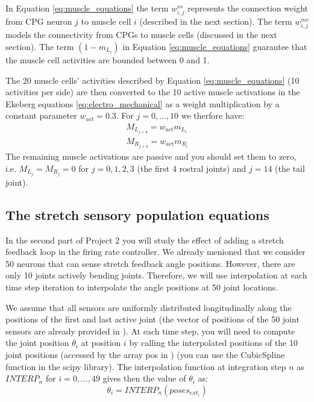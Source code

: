 \documentclass{cmc}
\begin{document}
In Equation \ref{eq:muscle_equations} the term $w^{ss}_{i,j}$ represents the connection weight from CPG neuron $j$ to muscle cell $i$ (described in the next section). The term $w^{mc}_{i,j}$  models the connectivity from CPGs to muscle cells (discussed in the next section). The term $(1-m_{L_i})$ in Equation \ref{eq:muscle_equations} guarantee that the muscle cell activities are bounded between 0 and 1.

The 20 muscle cells' activities described by Equation \ref{eq:muscle_equations} (10 activities per side) are then converted to the 10 active muscle activations in the Ekeberg equations \ref{eq:electro_mechanical} as a weight multiplication by a constant parameter $w_{act}=0.3$. For $j=0,...,10$ we therfore have:
\begin{equation}
    \begin{array}{lcl}
	M_{L_{j+4}} = w_{act} m_{L_i}\\
	M_{R_{j+4}} = w_{act} m_{R_i}
    \end{array}
	\label{eq:muscle_equations}
\end{equation}
The remaining muscle activations are passive and you should set them to zero, i.e. $M_{L_{j}}=M_{R_{j}}=0$ for $j=0,1,2,3$ (the first 4 rostral joints) and $j=14$ (the tail joint).


\subsection*{The stretch sensory population equations}
In the second part of Project 2 you will study the effect of adding a stretch feedback loop in the firing rate controller. We already menioned that we consider 50 neurons that can sense stretch feedback angle positions. However, there are only 10 joints actively bending joints. Therefore, we will use interpolation at each time step iteration to interpolate the angle positions at 50 joint locations.

We assume that all sensors are uniformly distributed longitudinally along the positions of the first and last active joint (the vector of positions of the 50 joint sensors are already provided in ). At each time step, you will need to compute the joint position $\theta_i$ at position $i$ by calling the interpolated positions of the 10 joint positions (accessed by the array pos in ) (you can use the CubicSpline function in the scipy library). The interpolation function at integration step $n$ as $INTERP_n$ for $i=0,...,49$ gives then the value of $\theta_i$ as:
$$ \theta_i = INTERP_n(poses_{ext_i}) $$
\end{document}
